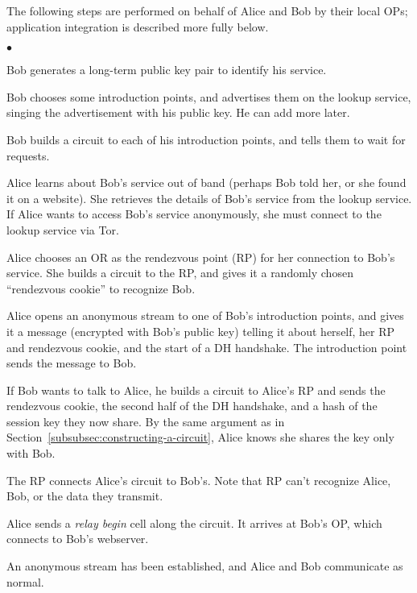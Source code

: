 \documentclass[twocolumn]{article}
\newenvironment{tightlist}{\begin{list}{$\bullet$}{
  \setlength{\itemsep}{0mm}
    \setlength{\parsep}{0mm}
    }}{\end{list}}
\begin{document}
The following steps are
performed on behalf of Alice and Bob by their local OPs;
application integration is described more fully below.

\begin{tightlist}
\item Bob generates a long-term public key pair to identify his service.
\item Bob chooses some introduction points, and advertises them on
      the lookup service, singing the advertisement with his public key.  He
      can add more later.
\item Bob builds a circuit to each of his introduction points, and tells
      them to wait for requests.
\item Alice learns about Bob's service out of band (perhaps Bob told her,
      or she found it on a website).  She retrieves the details of Bob's
      service from the lookup service.  If Alice wants to access Bob's
      service anonymously, she must connect to the lookup service via Tor.
\item Alice chooses an OR as the rendezvous point (RP) for her connection to
      Bob's service. She builds a circuit to the RP, and gives it a
      randomly chosen ``rendezvous cookie'' to recognize Bob.
\item Alice opens an anonymous stream to one of Bob's introduction
      points, and gives it a message (encrypted with Bob's public key)
      telling it about herself,
      her RP and rendezvous cookie, and the
      start of a DH
      handshake. The introduction point sends the message to Bob.
\item If Bob wants to talk to Alice, he builds a circuit to Alice's
      RP and sends the rendezvous cookie, the second half of the DH
      handshake, and a hash of the session
      key they now share. By the same argument as in
      Section~\ref{subsubsec:constructing-a-circuit}, Alice knows she
      shares the key only with Bob.
\item The RP connects Alice's circuit to Bob's. Note that RP can't
      recognize Alice, Bob, or the data they transmit.
\item Alice sends a \emph{relay begin} cell along the circuit. It
      arrives at Bob's OP, which connects to Bob's
      webserver.
\item An anonymous stream has been established, and Alice and Bob
      communicate as normal.
\end{tightlist}
\end{document}
